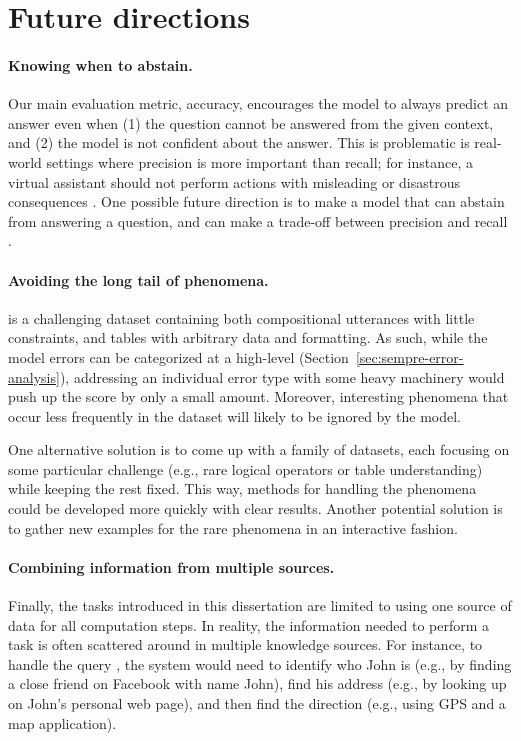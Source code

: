 \section{Future directions}

\paragraph{Knowing when to abstain.}
Our main evaluation metric, accuracy,
encourages the model to always predict an answer
even when (1) the question cannot be answered from the given context,
and (2) the model is not confident about the answer.
This is problematic is real-world settings
where precision is more important than recall;
for instance, a virtual assistant should not perform actions
with misleading or disastrous consequences
\cite{dhamdhere2017abductive}.
One possible future direction is to make a model
that can abstain from answering a question,
and can make a trade-off between precision and recall
\cite{yao2014freebase,rajpurkar2018squadrun,dong2018confidence}.

\paragraph{Avoiding the long tail of phenomena.}
\wtq is a challenging dataset containing both compositional utterances
with little constraints, and tables with arbitrary data and formatting.
As such, while the model errors can be categorized at a high-level
(Section~\ref{sec:sempre-error-analysis}),
addressing an individual error type with some heavy machinery
would push up the score by only a small amount.
Moreover, interesting phenomena
that occur less frequently in the dataset
will likely to be ignored by the model.

One alternative solution is to come up with a family of datasets,
each focusing on some particular challenge (e.g., rare logical operators
or table understanding) while keeping the rest fixed.
This way, methods for handling the phenomena could be developed
more quickly with clear results.
Another potential solution is to gather new examples
for the rare phenomena in an interactive fashion.

\paragraph{Combining information from multiple sources.}
Finally, the tasks introduced in this dissertation
are limited to using one source of data for all computation steps.
In reality, the information needed to perform a task
is often scattered around in multiple knowledge sources.
For instance, to handle the query ,
the system would need to identify who John is
(e.g., by finding a close friend on Facebook with name John),
find his address
(e.g., by looking up on John's personal web page),
and then find the direction
(e.g., using GPS and a map application).

